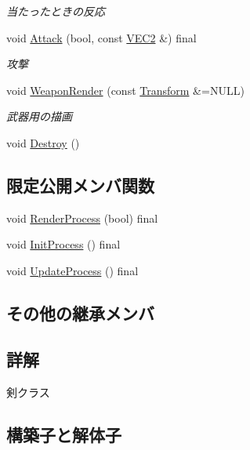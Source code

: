 \begin{DoxyCompactItemize}
\begin{DoxyCompactList}\small\item\em 当たったときの反応 \end{DoxyCompactList}\item 
void \mbox{\hyperlink{class_sword_a923943b87ee19f3670bfcdb18d670e1e}{Attack}} (bool, const \mbox{\hyperlink{common_8h_afb0c5e21d4133ff4f200992c0b534e1b}{V\+E\+C2}} \&) final
\begin{DoxyCompactList}\small\item\em 攻撃 \end{DoxyCompactList}\item 
void \mbox{\hyperlink{class_sword_aba05706b8b2480a8317595f92a7bc5ce}{Weapon\+Render}} (const \mbox{\hyperlink{class_transform}{Transform}} \&=N\+U\+LL)
\begin{DoxyCompactList}\small\item\em 武器用の描画 \end{DoxyCompactList}\item 
void \mbox{\hyperlink{class_sword_a8473b694775374df4d9b6305cfa82293}{Destroy}} ()
\end{DoxyCompactItemize}
\subsection*{限定公開メンバ関数}
\begin{DoxyCompactItemize}
\item 
void \mbox{\hyperlink{class_sword_a7f5d2c6e6e0104e9a85f600eec14ef6d}{Render\+Process}} (bool) final
\item 
void \mbox{\hyperlink{class_sword_aab0c07888f3aaee1ba25d668ac7c847a}{Init\+Process}} () final
\item 
void \mbox{\hyperlink{class_sword_a3e0221aa5c05ecada9def39fb38c0059}{Update\+Process}} () final
\end{DoxyCompactItemize}
\subsection*{その他の継承メンバ}


\subsection{詳解}
剣クラス 

\subsection{構築子と解体子}
\mbox{\label{class_sword_af33284e40825ec8ddccd01fa5833be36}} 
